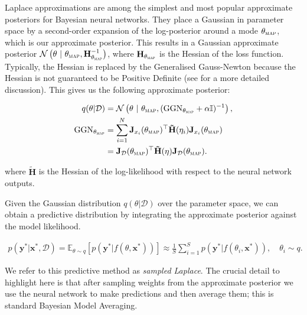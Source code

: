 Laplace approximations are among the simplest and most popular approximate posteriors for Bayesian
neural networks.  They place a Gaussian in parameter space by a second-order expansion of the
log-posterior around a mode $\theta_{\textsc{map}}$, which is our approximate posterior. This results in a Gaussian approximate posterior $\mathcal{N}\left(\theta ~|~ \theta_{\textsc{map}}, \mathbf{H}_{\theta_{\textsc{map}}}^{-1}\right)$, where $\mathbf{H}_{\theta_{\textsc{map}}}$ is the Hessian of the loss function. Typically, the Hessian is replaced by the Generalised Gauss-Newton because the Hessian is not guaranteed to be Positive Definite (see  for a more detailed discussion). This gives us the following approximate posterior:

\begin{align}
\begin{split}
  q(\theta | \mathcal{D}) &= \mathcal{N}\left(\theta ~|~ \theta_{\textsc{map}}, (\textrm{GGN}_{\theta_{\textsc{map}}} + \alpha\mathbb{I})^{-1}\right), \\ %
  \textrm{GGN}_{\theta_{\textsc{map}}} &= \sum_{i=1}^N \mathbf{J}_{x_i}(\theta_{\textsc{map}})^\top \mathbf{\tilde{H}}(\eta_i)  \mathbf{J}_{x_i}(\theta_{\textsc{map}}) \\
  &= \mathbf{J}_{\mathcal{D}}(\theta_{\textsc{map}})^\top \mathbf{\tilde{H}}(\eta)  \mathbf{J}_{\mathcal{D}}(\theta_{\textsc{map}}).
\end{split}
\end{align}

where $\mathbf{\tilde{H}}$ is the Hessian of the log-likelihood with respect to the neural network outputs. 

Given the Gaussian distribution $q(\theta|\mathcal{D})$ over the parameter space, we can obtain a predictive distribution by integrating the approximate posterior against the model likelihood. 

\begin{align}
    p(\mathbf{y}^*|\mathbf{x}^*\!, \mathcal{D}) = \mathbb{E}_{\theta\sim q}[p(\mathbf{y}^*|f(\theta, \mathbf{x}^*))] %
                            \approx \frac{1}{S}\! \sum_{i=1}^S p(\mathbf{y}^*|f(\theta_i, \mathbf{x}^*)), \quad \theta_i \sim q.
\end{align}

We refer to this predictive method as \emph{sampled Laplace}. The crucial detail to highlight here is that after sampling weights from the approximate posterior we use the neural network to make predictions and then average them; this is standard Bayesian Model Averaging. 

